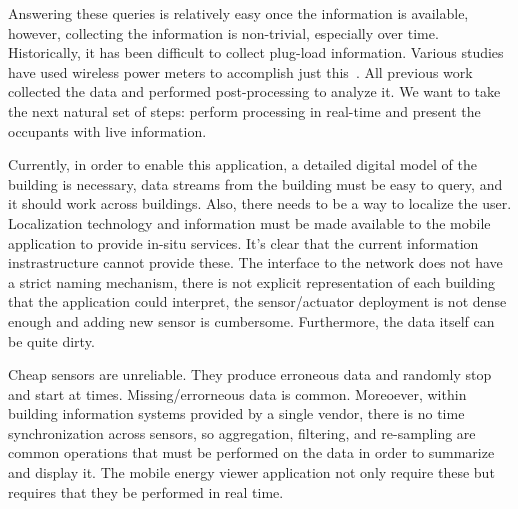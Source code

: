 Answering these queries is relatively easy once the information is available, however, collecting the information
is non-trivial, especially over time.  Historically, it has been difficult to collect plug-load information.
Various studies have used wireless power meters to accomplish just this~\cite{stephscale, lanz, aceee}.
All previous work collected the data and performed post-processing to analyze it.  We want to take the next
natural set of steps: perform processing in real-time and present the occupants with live information.

Currently, in order to enable this application, a detailed digital model of the building is necessary, data streams from the building must
be easy to query, and it should work across buildings.  Also, there needs to be a way to localize the user. 
Localization technology and information must be made available to the mobile application to provide in-situ services.
It's clear that the current information instrastructure cannot provide these.  The interface to the network does not have
a strict naming mechanism, there is not explicit representation of each building that the application could interpret, 
the sensor/actuator deployment is not dense enough and adding new sensor is cumbersome.  Furthermore, the data itself can be quite dirty.

Cheap sensors are unreliable.  They produce erroneous data and randomly stop and start at times.  Missing/errorneous data is common.
Moreoever, within building information systems provided by a single vendor, there is no time synchronization across sensors, so
aggregation, filtering, and re-sampling are common operations that must be performed on the data in order to summarize and display it.
The mobile energy viewer application not only require these but requires that they be performed in real time.





